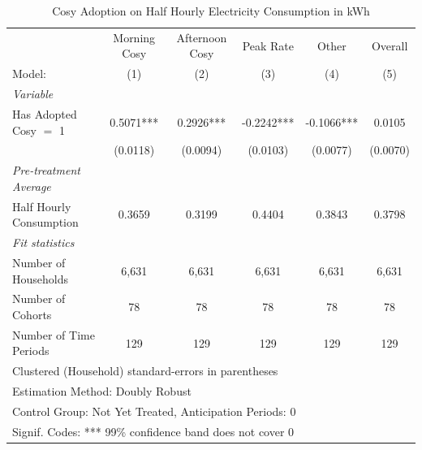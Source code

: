 \begin{table}[htbp]
   \caption{\label{tab:cosy-did-cs} Cosy Adoption on Half Hourly Electricity Consumption in kWh}
   \centering
   \begin{tabular}{lccccc}
      \tabularnewline \midrule \midrule
                                     & Morning Cosy     & Afternoon Cosy     & Peak Rate     & Other     & Overall \\   
      Model:                         & (1)              & (2)              & (3)              & (4)              & (5)\\  
      \midrule
      \emph{Variable}\\
      Has Adopted Cosy $=$ 1     & 0.5071*** & 0.2926*** & -0.2242*** & -0.1066*** & 0.0105\\   
                                     & (0.0118)         & (0.0094)         & (0.0103)         & (0.0077)         & (0.0070)\\   
      \midrule
      \emph{Pre-treatment Average}\\
      Half Hourly Consumption              & 0.3659 & 0.3199 & 0.4404 & 0.3843 & 0.3798\\   
      \midrule
      \emph{Fit statistics}\\
      Number of Households                   & 6,631           & 6,631           & 6,631           & 6,631           & 6,631\\  
      Number of Cohorts              & 78              & 78              & 78              & 78              & 78\\  
      Number of Time Periods         & 129             & 129             & 129             & 129             & 129\\  
      \midrule \midrule
      \multicolumn{6}{l}{Clustered (Household) standard-errors in parentheses}\\
      \multicolumn{6}{l}{Estimation Method: Doubly Robust}\\
      \multicolumn{6}{l}{Control Group: Not Yet Treated, Anticipation Periods: 0}\\
      \multicolumn{6}{l}{Signif. Codes: *** 99\% confidence band does not cover 0}\\
   \end{tabular}
\end{table}

